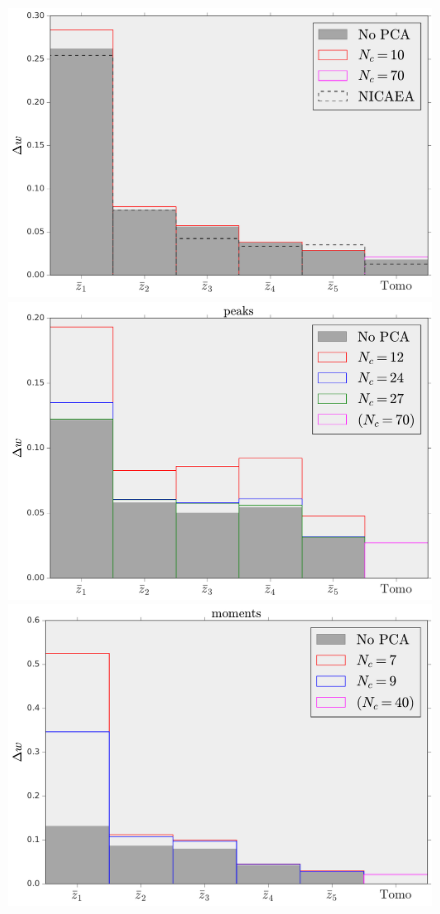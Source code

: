 \documentclass[reprint,aps,prd,superscriptaddress,showkeys,showpacs]{revtex4-1}
\begin{document}
\begin{figure}
\includegraphics[scale=0.3]{Figures/w_power_spectrum_no_pca.pdf}
\includegraphics[scale=0.3]{Figures/w_peaks_no_pca.pdf}
\includegraphics[scale=0.3]{Figures/w_moments_no_pca.pdf}

\end{figure}
\end{document}
